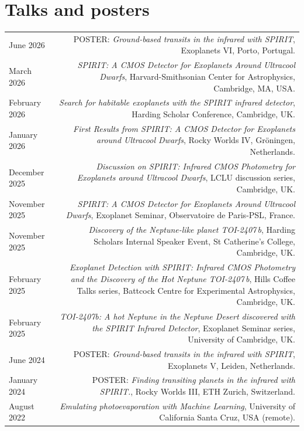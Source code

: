 \documentclass{article}
\begin{document}
\section*{Talks and posters}
\begin{tabular}{L!{\vrule}R}

    June 2026 & POSTER: \textit{Ground-based transits in the infrared with SPIRIT}, Exoplanets VI, Porto, Portugal. \\

    March 2026 & \textit{SPIRIT: A CMOS Detector for Exoplanets Around Ultracool Dwarfs}, Harvard-Smithsonian Center for Astrophysics, Cambridge, MA, USA. \\

    February 2026 & \textit{Search for habitable exoplanets with the SPIRIT infrared detector}, Harding Scholar Conference, Cambridge, UK. \\

    January 2026 & \textit{First Results from SPIRIT: A CMOS Detector for Exoplanets around Ultracool Dwarfs}, Rocky Worlds IV, Gröningen, Netherlands. \\

    December 2025 & \textit{Discussion on SPIRIT: Infrared CMOS Photometry for Exoplanets around Ultracool Dwarfs}, LCLU discussion series, Cambridge, UK. \\

    November 2025 & \textit{SPIRIT: A CMOS Detector for Exoplanets Around Ultracool Dwarfs}, Exoplanet Seminar, Observatoire de Paris-PSL, France. \\

    November 2025 & \textit{Discovery of the Neptune-like planet TOI-2407\,b}, Harding Scholars Internal Speaker Event, St Catherine's College, Cambridge, UK. \\

    February 2025 & \textit{Exoplanet Detection with SPIRIT: Infrared CMOS Photometry and the Discovery of the Hot Neptune TOI-2407\,b}, Hills Coffee Talks series, Battcock Centre for Experimental Astrophysics, Cambridge, UK. \\

    February 2025 & \textit{TOI-2407b: A hot Neptune in the Neptune Desert discovered with the SPIRIT Infrared Detector}, Exoplanet Seminar series, University of Cambridge, UK. \\

    June 2024 & POSTER: \textit{Ground-based transits in the infrared with SPIRIT}, Exoplanets V, Leiden, Netherlands. \\

    January 2024 & POSTER: \textit{Finding transiting planets in the infrared with SPIRIT.}, Rocky Worlds III, ETH Zurich, Switzerland. \\

    August 2022 & \textit{Emulating photoevaporation with Machine Learning}, University of California Santa Cruz, USA (remote). \\

\end{tabular}
\end{document}
